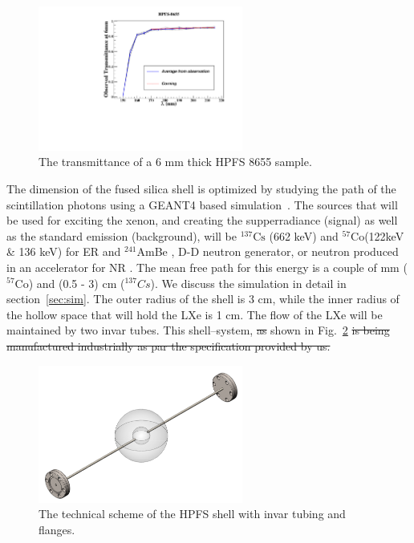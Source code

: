 \begin{figure}
   \centering
   \includegraphics[width=0.6\textwidth]{ObservedTransmittance1.pdf}
   \caption{The transmittance of a 6 mm thick HPFS 8655 sample.} 
   \label{fig:transmittance}
\end{figure}

The dimension of the fused silica shell is optimized by studying the path of the scintillation photons using a GEANT4 based simulation~\cite{Agostinelli:2002hh}. 
The sources that will be used for exciting the xenon, and creating the supperradiance (signal) as well as the standard emission (background), 
will be $^{137} \mathrm{Cs}$ (662 keV) and $^{57} \mathrm{Co}$(122keV \& 136 keV) for ER and $^{241}$AmBe , D-D neutron generator, or neutron 
produced in an accelerator for NR . The mean free path for this energy is a couple of mm ($^{57} \mathrm{Co}$) and (0.5 - 3) cm ($^{137} Cs$).  
We discuss the simulation in detail in section~\ref{sec:sim}. 
The outer radius of the shell is 3 cm, while the inner radius of the hollow space that will hold the 
LXe is 1 cm. The flow of the LXe will be maintained by two invar tubes. This shell--system, \sout{as}  shown 
in Fig.~\ref{fig:sphere} \sout{is being manufactured industrially as par the specification provided by us.}

\begin{figure}
   \centering
   \includegraphics[width=0.6\textwidth]{sphere.png}
   \caption{The technical scheme of the HPFS shell with invar tubing and flanges.} 
   \label{fig:sphere}
\end{figure}


